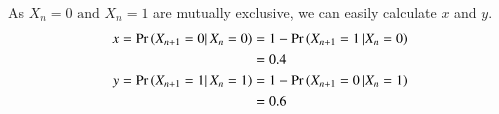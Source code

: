 \documentclass[journal,12pt,twocolumn]{IEEEtran}
\begin{document}


\par As $X_n=0 \text{ and } X_n=1$ are mutually exclusive, we can easily calculate $x$ and $y$.
\begin{align}
   x=\pr{X_{n+1} = 0 |\, X_{n}=0} &= 1-\pr{X_{n+1} = 1 \,| X_{n}=0}\nonumber
    \\&= 0.4 \label{x}\\
    y=\pr{X_{n+1} = 1 |\, X_{n}=1} &= 1-\pr{X_{n+1} = 0 \,| X_{n}=1}\nonumber
    \\&= 0.6 \label{y}
\end{align}
\end{document}
